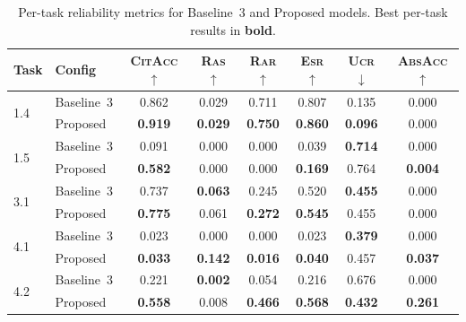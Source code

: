 \documentclass[11pt,a4paper]{article}
\newcommand{\citacc}{\textsc{CitAcc}}
\newcommand{\ras}{\textsc{Ras}}
\newcommand{\rar}{\textsc{Rar}}
\newcommand{\esr}{\textsc{Esr}}
\newcommand{\ucr}{\textsc{Ucr}}
\newcommand{\absacc}{\textsc{AbsAcc}}
\begin{document}
\begin{table}[htbp]
\centering
\caption{Per-task reliability metrics for Baseline~3 and Proposed models. Best per-task results in \textbf{bold}.}
\label{tab:reliability_per_task}
\begin{tabular}{@{}llcccccc@{}}
\toprule
\textbf{Task} & \textbf{Config} & \textbf{\citacc}$\uparrow$ & \textbf{\ras}$\uparrow$ & \textbf{\rar}$\uparrow$ & \textbf{\esr}$\uparrow$ & \textbf{\ucr}$\downarrow$ & \textbf{\absacc}$\uparrow$ \\
\midrule
\multirow{2}{*}{1.4} & Baseline~3 & 0.862 & 0.029 & 0.711 & 0.807 & 0.135 & 0.000 \\
                     & Proposed   & \textbf{0.919} & \textbf{0.029} & \textbf{0.750} & \textbf{0.860} & \textbf{0.096} & 0.000 \\
\midrule
\multirow{2}{*}{1.5} & Baseline~3 & 0.091 & 0.000 & 0.000 & 0.039 & \textbf{0.714} & 0.000 \\
                     & Proposed   & \textbf{0.582} & 0.000 & 0.000 & \textbf{0.169} & 0.764 & \textbf{0.004} \\
\midrule
\multirow{2}{*}{3.1} & Baseline~3 & 0.737 & \textbf{0.063} & 0.245 & 0.520 & \textbf{0.455} & 0.000 \\
                     & Proposed   & \textbf{0.775} & 0.061 & \textbf{0.272} & \textbf{0.545} & 0.455 & 0.000 \\
\midrule
\multirow{2}{*}{4.1} & Baseline~3 & 0.023 & 0.000 & 0.000 & 0.023 & \textbf{0.379} & 0.000 \\
                     & Proposed   & \textbf{0.033} & \textbf{0.142} & \textbf{0.016} & \textbf{0.040} & 0.457 & \textbf{0.037} \\
\midrule
\multirow{2}{*}{4.2} & Baseline~3 & 0.221 & \textbf{0.002} & 0.054 & 0.216 & 0.676 & 0.000 \\
                     & Proposed   & \textbf{0.558} & 0.008 & \textbf{0.466} & \textbf{0.568} & \textbf{0.432} & \textbf{0.261} \\
\bottomrule
\end{tabular}
\end{table}
\end{document}
